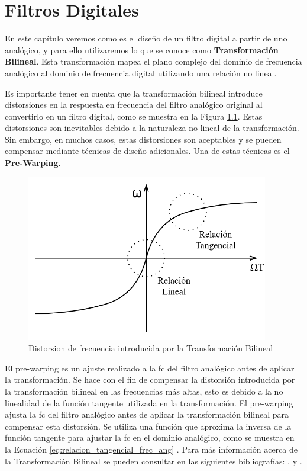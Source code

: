 \chapter{Filtros Digitales}

En este capítulo veremos como es el diseño de un filtro digital a partir de uno analógico, y para ello utilizaremos lo que se conoce como \textbf{Transformación Bilineal}. Esta transformación mapea el plano complejo del dominio de frecuencia analógico al dominio de frecuencia digital utilizando una relación no lineal.

Es importante tener en cuenta que la transformación bilineal introduce distorsiones en la respuesta en frecuencia del filtro analógico original al convertirlo en un filtro digital, como se muestra en la Figura \ref{fig:distorsion_frecuencia_angular}. Estas distorsiones son inevitables debido a la naturaleza no lineal de la transformación. Sin embargo, en muchos casos, estas distorsiones son aceptables y se pueden compensar mediante técnicas de diseño adicionales. Una de estas técnicas es el \textbf{Pre-Warping}.

\begin{figure}[H]
  \centering
  \includegraphics[width=300pt]{images/diagramas-distorsion-frecuencia.png}
  \caption{Distorsion de frecuencia introducida por la Transformación Bilineal}
  \label{fig:distorsion_frecuencia_angular}
\end{figure}

El pre-warping es un ajuste realizado a la \gls{fc} del filtro analógico antes de aplicar la transformación. Se hace con el fin de compensar la distorsión introducida por la transformación bilineal en las frecuencias más altas, esto es debido a la no linealidad de la función tangente utilizada en la transformación. El pre-warping ajusta la \gls{fc} del filtro analógico antes de aplicar la transformación bilineal para compensar esta distorsión. Se utiliza una función que aproxima la inversa de la función tangente para ajustar la \gls{fc} en el dominio analógico, como se muestra en la Ecuación \ref{eq:relacion_tangencial_frec_ang} \cite{rabiner1995theory}. Para más información acerca de la Transformación Bilineal se pueden consultar en las siguientes bibliografías: \cite{proakis1996digital}, \cite{oppenheim1989discrete} y \cite{oppenheim1999digital}.


